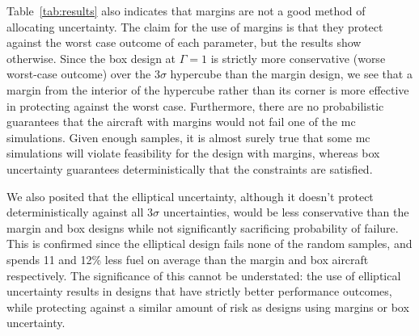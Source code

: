 Table~\ref{tab:results} also indicates that margins are not a good method of
allocating uncertainty. The claim for the use of margins is that they protect against
the worst case outcome of each parameter, but the results show otherwise.
Since the box design at $\Gamma=1$ is strictly
more conservative (worse worst-case outcome) over the $3\sigma$ hypercube
than the margin design, we see that a margin from the interior of the hypercube
rather than its corner is more effective in protecting against the worst case.
Furthermore, there are no probabilistic
guarantees that the aircraft
with margins would not fail one of the \gls{mc} simulations. Given enough samples,
it is almost surely true that some \gls{mc} simulations will violate feasibility
for the design with margins,
whereas box uncertainty guarantees deterministically that the constraints are satisfied.

We also posited that the elliptical uncertainty, although it doesn't
protect deterministically against all $3\sigma$ uncertainties, would be less conservative than the
margin and box designs while not significantly sacrificing probability of failure. This is
confirmed since the elliptical design fails none of the random samples,
and spends 11 and 12\% less fuel on average
than the margin and box aircraft respectively.
The significance of this cannot be understated: the use of elliptical uncertainty
results in designs that have strictly better performance outcomes, while protecting
against a similar amount of risk as designs using margins or box uncertainty.

